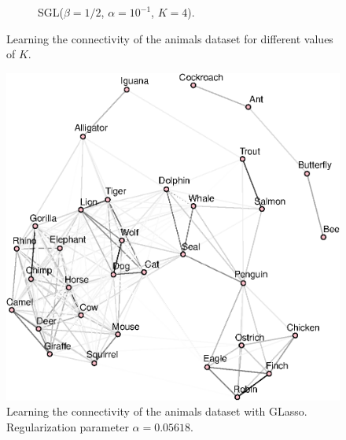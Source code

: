 \begin{figure}[!htb]
\begin{subfigure}[b]{0.475\textwidth}
      \caption{\textsf{SGL}($\beta = 1/2$, $\alpha = 10^{-1}$, $K = 4$).}
    \end{subfigure}
    \caption{Learning the connectivity of the \textsf{animals} dataset for different values of $K$.}
    \label{fig:animals}
\end{figure}

\begin{figure}
  \centering
  \includegraphics[width=.475\textwidth]{animals/latex/figures/animals_glasso.eps}
  \caption{Learning the connectivity of the \textsf{animals} dataset with \textsf{GLasso}.
           Regularization parameter $\alpha = 0.05618$.}
  \label{fig:animals-glasso}
\end{figure}
